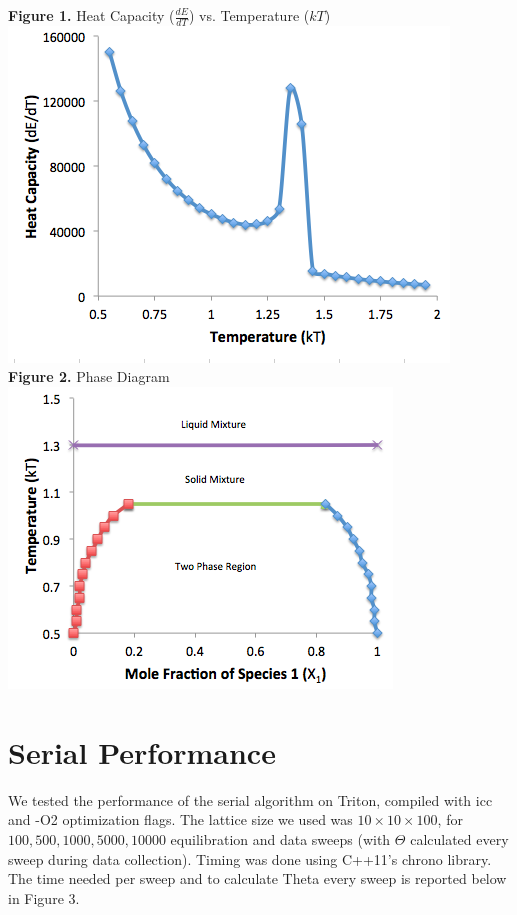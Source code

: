 \documentclass{article}
\begin{document}
\vspace{-5pt}
\begin{center}
\textbf{Figure 1.} Heat Capacity ($\frac{dE}{dT}$) vs. Temperature ($kT$)\\
\includegraphics[scale=0.5]{SerialMeltingTemp.png}\\

\vspace{5pt}
\textbf{Figure 2.} Phase Diagram\\
\includegraphics[scale=0.5]{SerialPhaseDiagram.png}\\
\end{center}

\newpage

\section*{Serial Performance}
\vspace{-7pt}
\indent\indent We tested the performance of the serial algorithm on Triton, compiled with icc and -O2 optimization flags. The lattice size we used was $10\times10\times100$, for $100, 500, 1000, 5000, 10000$ equilibration and data sweeps (with $\Theta$ calculated every sweep during data collection). Timing was done using C++11's chrono library. The time needed per sweep and to calculate Theta every sweep is reported below in Figure 3.
\end{document}
